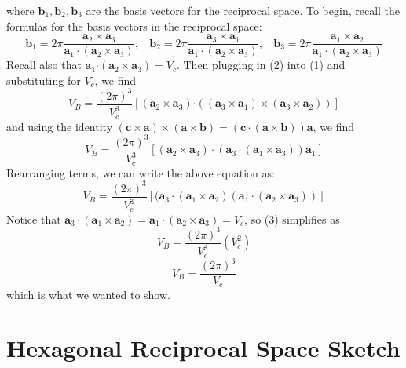 \documentclass{article}
\begin{document}
where $\textbf{b}_1, \textbf{b}_2, \textbf{b}_3$ are the basis vectors for the reciprocal space. 
\newline
To begin, recall the formulas for the basis vectors in the reciprocal space:
\begin{equation}
    \textbf{b}_1 = 2\pi \frac{\textbf{a}_2 \times \textbf{a}_3}{\textbf{a}_1 \cdot ( \textbf{a}_2 \times \textbf{a}_3)}, \:\:\:\: \textbf{b}_2 = 2\pi \frac{\textbf{a}_3 \times \textbf{a}_1}{\textbf{a}_1 \cdot ( \textbf{a}_2 \times \textbf{a}_3)}, \:\:\:\: \textbf{b}_3 = 2\pi \frac{\textbf{a}_1 \times \textbf{a}_2}{\textbf{a}_1 \cdot ( \textbf{a}_2 \times \textbf{a}_3)}
\end{equation}
Recall also that $\textbf{a}_1 \mathbf{\cdot} (\textbf{a}_2 \times \textbf{a}_3) = V_c$. Then plugging in (2) into (1) and substituting for $V_c$, we find
\[V_B = \frac{(2\pi)^3}{V_c^3}\left[ (\textbf{a}_2 \times \textbf{a}_3) \mathbf{\cdot} ((\textbf{a}_3 \times \textbf{a}_1) \times (\textbf{a}_3 \times \textbf{a}_2)) \right]\]
and using the identity $(\textbf{c} \times \textbf{a}) \times (\textbf{a} \times \textbf{b}) = (\textbf{c} \cdot (\textbf{a} \times \textbf{b})) 
\textbf{a}$, we find
\[V_B = \frac{(2\pi)^3}{V_c^3}\left[(\textbf{a}_2 \times \textbf{a}_3) \cdot (\textbf{a}_3 \cdot (\textbf{a}_1 \times \textbf{a}_3)) \textbf{a}_1 \right]\]
Rearranging terms, we can write the above equation as:
\begin{equation}
    V_B = \frac{(2\pi)^3}{V_c^3}\left[ (\textbf{a}_3 \cdot (\textbf{a}_1 \times \textbf{a}_2)(\textbf{a}_1 \cdot (\textbf{a}_2 \times \textbf{a}_3)) \right]
\end{equation}
Notice that $\textbf{a}_3 \cdot (\textbf{a}_1 \times \textbf{a}_2) = \textbf{a}_1 \cdot (\textbf{a}_2 \times \textbf{a}_3) = V_c$, so (3) simplifies as
\[V_B = \frac{(2\pi)^3}{V_c^3}(V_c^2)\]
\[V_B = \frac{(2\pi)^3}{V_c}\]
which is what we wanted to show.


\newpage
\section*{Hexagonal Reciprocal Space Sketch}
\end{document}
